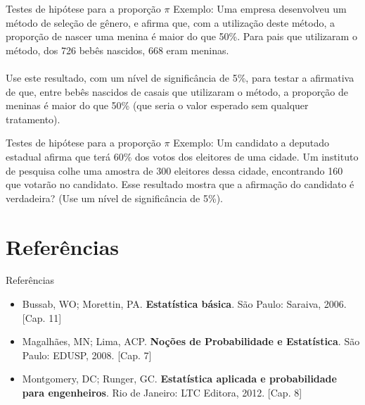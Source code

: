 \documentclass[10pt]{beamer}\usepackage[]{graphicx}\usepackage[]{color}
\theoremstyle{definition}
\begin{document}
\begin{frame}{Testes de hipótese para a proporção $\pi$}
  Exemplo: Uma empresa desenvolveu um método de seleção de gênero, e
  afirma que, com a utilização deste método, a proporção de nascer uma
  menina é maior do que 50\%. Para pais que utilizaram o método, dos 726
  bebês nascidos, 668 eram meninas.\\~\\
  Use este resultado, com um nível de significância de 5\%, para testar
  a afirmativa de que, entre bebês nascidos de casais que utilizaram o
  método, a proporção de meninas é maior do que 50\% (que seria o valor
  esperado sem qualquer tratamento).
\end{frame}

\begin{frame}{Testes de hipótese para a proporção $\pi$}
  Exemplo: Um candidato a deputado estadual afirma que terá 60\% dos
  votos dos eleitores de uma cidade. Um instituto de pesquisa colhe uma
  amostra de 300 eleitores dessa cidade, encontrando 160 que votarão no
  candidato. Esse resultado mostra que a afirmação do candidato é
  verdadeira? (Use um nível de significância de 5\%).
\end{frame}

\section{Referências}

\begin{frame}{Referências}
  \begin{itemize}
  \item Bussab, WO; Morettin, PA. \textbf{Estatística básica}. São
    Paulo: Saraiva, 2006. [Cap. 11]
  \item Magalhães, MN; Lima, ACP. \textbf{Noções de Probabilidade e
      Estatística}. São Paulo: EDUSP, 2008. [Cap. 7]
  \item Montgomery, DC; Runger, GC. \textbf{Estatística aplicada e
      probabilidade para engenheiros}. Rio de Janeiro: LTC Editora,
    2012. [Cap. 8]
  \end{itemize}
\end{frame}
\end{document}
